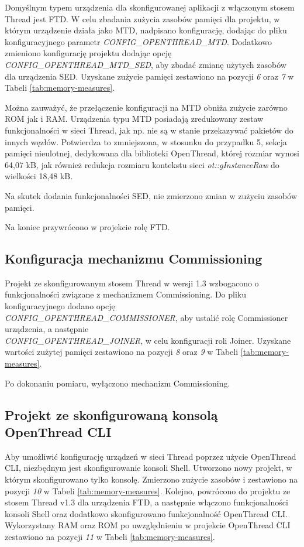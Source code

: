     Domyślnym typem urządzenia dla skonfigurowanej aplikacji z włączonym stosem Thread jest FTD. W celu zbadania zużycia zasobów pamięci dla projektu, w którym urządzenie działa jako MTD, nadpisano konfigurację, dodając do pliku konfiguracyjnego parametr \textit{CONFIG\_OPENTHREAD\_MTD}. Dodatkowo zmieniono konfigurację projektu dodając opcję \textit{CONFIG\_OPENTHREAD\_MTD\_SED}, aby zbadać zmianę użytych zasobów dla urządzenia SED. Uzyskane zużycie pamięci zestawiono na pozycji \textit{6} oraz \textit{7} w Tabeli \ref{tab:memory-measures}.

    Można zauważyć, że przełączenie konfiguracji na MTD obniża zużycie zarówno ROM jak i RAM. Urządzenia typu MTD posiadają zredukowany zestaw funkcjonalności w sieci Thread, jak np. nie są w stanie przekazywać pakietów do innych węzłów. Potwierdza to zmniejszona, w stosunku do przypadku 5, sekcja pamięci nieulotnej, dedykowana dla biblioteki OpenThread, której rozmiar wynosi 64,07 kB, jak również redukcja rozmiaru kontekstu sieci \textit{ot::gInstanceRaw} do wielkości 18,48 kB.

    Na skutek dodania funkcjonalności SED, nie zmierzono zmian w zużyciu zasobów pamięci.

    Na koniec przywrócono w projekcie rolę FTD.

    \subsection{Konfiguracja mechanizmu Commissioning}
    Projekt ze skonfigurowanym stosem Thread w wersji 1.3 wzbogacono o funkcjonalności związane z mechanizmem Commissioning. Do pliku konfiguracyjnego dodano opcję \\\textit{CONFIG\_OPENTHREAD\_COMMISSIONER}, aby ustalić rolę Commissioner urządzenia, a następnie \\\textit{CONFIG\_OPENTHREAD\_JOINER}, w celu konfiguracji roli Joiner. Uzyskane wartości zużytej pamięci zestawiono na pozycji \textit{8} oraz \textit{9} w Tabeli \ref{tab:memory-measures}.
    
    Po dokonaniu pomiaru, wyłączono mechanizm Commissioning.

    \subsection{Projekt ze skonfigurowaną konsolą OpenThread CLI}

    Aby umożliwić konfigurację urządzeń w sieci Thread poprzez użycie OpenThread CLI, niezbędnym jest skonfigurowanie konsoli Shell. Utworzono nowy projekt, w którym skonfigurowano tylko konsolę. Zmierzono zużycie zasobów i zestawiono na pozycji \textit{10} w Tabeli \ref{tab:memory-measures}. Kolejno, powrócono do projektu ze stosem Thread v1.3 dla urządzenia FTD, a następnie włączono funkcjonalności konsoli Shell oraz dodatkowo skonfigurowano funkcjonalność OpenThread CLI. Wykorzystany RAM oraz ROM po uwzględnieniu w projekcie OpenThread CLI zestawiono na pozycji \textit{11} w Tabeli \ref{tab:memory-measures}.
        
